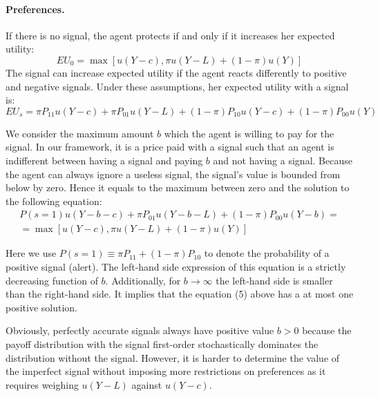 \documentclass[12pt,a4paper]{article}
\begin{document}
\vspace{10pt}
\paragraph{Preferences.} If there is no signal, the agent protects if and only if it increases her expected utility:
\begin{equation}
EU_0=\max[u(Y-c),\pi u(Y-L)+(1-\pi) u(Y)]
\end{equation}
The signal can increase expected utility if the agent reacts differently to positive and negative signals. Under these assumptions, her expected utility with a signal is:
\begin{equation}
EU_s=\pi P_{11}u(Y-c)+\pi P_{01}u(Y-L)+(1-\pi)P_{10}u(Y-c)+(1-\pi)P_{00}u(Y)
\end{equation}

We consider the maximum amount $b$ which the agent is willing to pay for the signal. In our framework, it is a price paid with a signal such that an agent is indifferent between having a signal and paying $b$ and not having a signal. Because the agent can always ignore a useless signal, the signal's value is bounded from below by zero. Hence it equals to the maximum between zero and the solution to the following equation:
\begin{equation}
\begin{split}
P(s=1)u(Y-b-c)+\pi P_{01}u(Y-b-L)+(1-\pi)P_{00}u(Y-b)=\\=\max[u(Y-c),\pi u(Y-L)+(1-\pi) u(Y)] 
\end{split}
\end{equation}

Here we use $P(s=1)\equiv \pi P_{11}+(1-\pi)P_{10}$ to denote the probability of a positive signal (alert). The left-hand side expression of this equation is a strictly decreasing function of $b$. Additionally, for $b\rightarrow \infty$ the left-hand side is smaller than the right-hand side. It implies that the equation (5) above has a at most one positive solution.

Obviously, perfectly accurate signals always have positive value $b>0$ because the payoff distribution with the signal first-order stochastically dominates the distribution without the signal. 
However, it is harder to determine the value of the imperfect signal without imposing more restrictions on preferences as it requires weighing $u(Y-L)$ against $u(Y-c)$.
\end{document}
